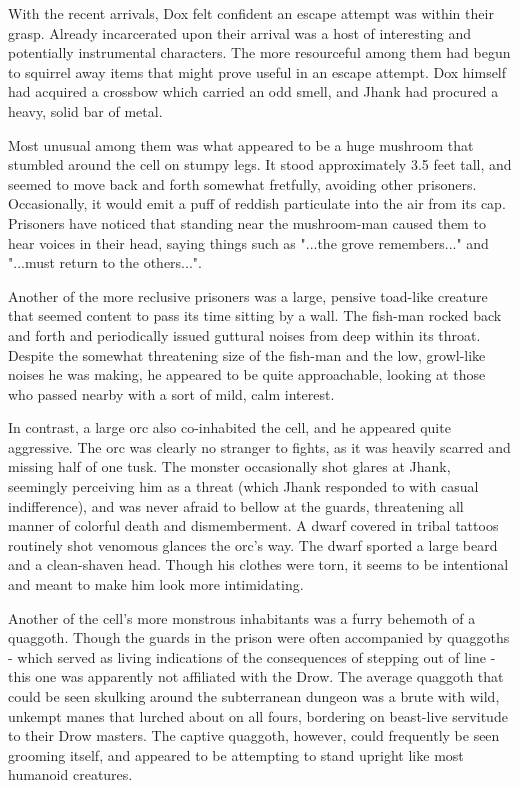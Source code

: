 \documentclass[letterpaper,10pt,twoside,twocolumn,openany]{book}
\begin{document}
With the recent arrivals, Dox felt confident an escape attempt was within their grasp. Already incarcerated upon their arrival was a host of interesting and potentially instrumental characters. The more resourceful among them had begun to squirrel away items that might prove useful in an escape attempt. Dox himself had acquired a crossbow which carried an odd smell, and Jhank had procured a heavy, solid bar of metal.

Most unusual among them was what appeared to be a huge mushroom that stumbled around the cell on stumpy legs. It stood approximately 3.5 feet tall, and seemed to move back and forth somewhat fretfully, avoiding other prisoners. Occasionally, it would emit a puff of reddish particulate into the air from its cap. Prisoners have noticed that standing near the mushroom-man caused them to hear voices in their head, saying things such as "...the grove remembers..." and "...must return to the others...".

Another of the more reclusive prisoners was a large, pensive toad-like creature that seemed content to pass its time sitting by a wall. The fish-man rocked back and forth and periodically issued guttural noises from deep within its throat. Despite the somewhat threatening size of the fish-man and the low, growl-like noises he was making, he appeared to be quite approachable, looking at those who passed nearby with a sort of mild, calm interest.

In contrast, a large orc also co-inhabited the cell, and he appeared quite aggressive. The orc was clearly no stranger to fights, as it was heavily scarred and missing half of one tusk. The monster occasionally shot glares at Jhank, seemingly perceiving him as a threat (which Jhank responded to with casual indifference), and was never afraid to bellow at the guards, threatening all manner of colorful death and dismemberment. A dwarf covered in tribal tattoos routinely shot venomous glances the orc's way. The dwarf sported a large beard and a clean-shaven head. Though his clothes were torn, it seems to be intentional and meant to make him look more intimidating.

Another of the cell's more monstrous inhabitants was a furry behemoth of a quaggoth. Though the guards in the prison were often accompanied by quaggoths - which served as living indications of the consequences of stepping out of line - this one was apparently not affiliated with the Drow. The average quaggoth that could be seen skulking around the subterranean dungeon was a brute with wild, unkempt manes that lurched about on all fours, bordering on beast-live servitude to their Drow masters. The captive quaggoth, however, could frequently be seen grooming itself, and appeared to be attempting to stand upright like most humanoid creatures.
\end{document}
